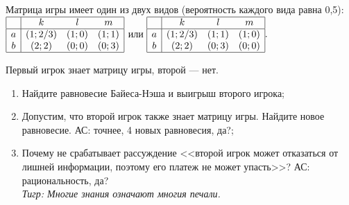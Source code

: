 \begin{problem}
Матрица игры имеет один из двух видов (вероятность каждого вида равна 0,5): 
 $\begin{array}{|c|ccc|}  \hline {} & {k} & {l} & {m} \\  \hline {a} & {\left(1;{2\mathord{\left/ {\vphantom {2 3}} \right. \kern-\nulldelimiterspace} 3} \right)} & {\left(1;0\right)} & {\left(1;1\right)} \\ {b} & {\left(2;2\right)} & {\left(0;0\right)} & {\left(0;3\right)} \\  \hline  \end{array}$  или  $\begin{array}{|c|ccc|}  \hline {} & {k} & {l} & {m} \\  \hline {a} & {\left(1;{2\mathord{\left/ {\vphantom {2 3}} \right. \kern-\nulldelimiterspace} 3} \right)} & {\left(1;1\right)} & {\left(1;0\right)} \\ {b} & {\left(2;2\right)} & {\left(0;3\right)} & {\left(0;0\right)} \\  \hline  \end{array}.$
 
 Первый игрок знает матрицу игры, второй --- нет.
 \begin{enumerate}
\item      Найдите равновесие Байеса-Нэша и выигрыш второго игрока;\\
\item      Допустим, что второй игрок также знает матрицу игры. Найдите новое равновесие. {\red АС: точнее, 4 новых равновесия, да?};\\
\item       Почему не срабатывает рассуждение <<второй игрок может отказаться от лишней информации,  поэтому его платеж не может упасть>>? {\red АС: рациональность, да?}\\
{\it Тигр: Многие знания означают многи{\red я} печали.}
\end{enumerate}


\begin{sol}

\end{sol}
\end{problem}









